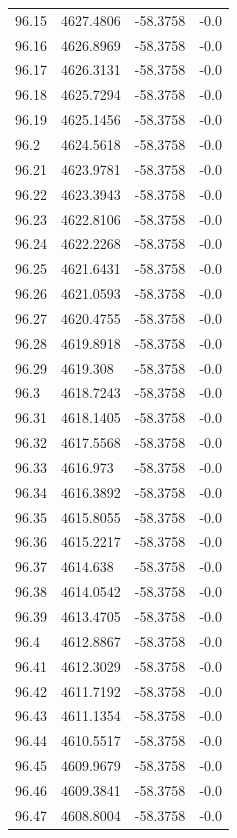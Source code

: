 \begin{table}[H]
\begin{tabular}{llll}
96.15 & 4627.4806 & -58.3758 & -0.0 \\
96.16 & 4626.8969 & -58.3758 & -0.0 \\
96.17 & 4626.3131 & -58.3758 & -0.0 \\
96.18 & 4625.7294 & -58.3758 & -0.0 \\
96.19 & 4625.1456 & -58.3758 & -0.0 \\
96.2 & 4624.5618 & -58.3758 & -0.0 \\
96.21 & 4623.9781 & -58.3758 & -0.0 \\
96.22 & 4623.3943 & -58.3758 & -0.0 \\
96.23 & 4622.8106 & -58.3758 & -0.0 \\
96.24 & 4622.2268 & -58.3758 & -0.0 \\
96.25 & 4621.6431 & -58.3758 & -0.0 \\
96.26 & 4621.0593 & -58.3758 & -0.0 \\
96.27 & 4620.4755 & -58.3758 & -0.0 \\
96.28 & 4619.8918 & -58.3758 & -0.0 \\
96.29 & 4619.308 & -58.3758 & -0.0 \\
96.3 & 4618.7243 & -58.3758 & -0.0 \\
96.31 & 4618.1405 & -58.3758 & -0.0 \\
96.32 & 4617.5568 & -58.3758 & -0.0 \\
96.33 & 4616.973 & -58.3758 & -0.0 \\
96.34 & 4616.3892 & -58.3758 & -0.0 \\
96.35 & 4615.8055 & -58.3758 & -0.0 \\
96.36 & 4615.2217 & -58.3758 & -0.0 \\
96.37 & 4614.638 & -58.3758 & -0.0 \\
96.38 & 4614.0542 & -58.3758 & -0.0 \\
96.39 & 4613.4705 & -58.3758 & -0.0 \\
96.4 & 4612.8867 & -58.3758 & -0.0 \\
96.41 & 4612.3029 & -58.3758 & -0.0 \\
96.42 & 4611.7192 & -58.3758 & -0.0 \\
96.43 & 4611.1354 & -58.3758 & -0.0 \\
96.44 & 4610.5517 & -58.3758 & -0.0 \\
96.45 & 4609.9679 & -58.3758 & -0.0 \\
96.46 & 4609.3841 & -58.3758 & -0.0 \\
96.47 & 4608.8004 & -58.3758 & -0.0 \\

\end{tabular}
\end{table}
